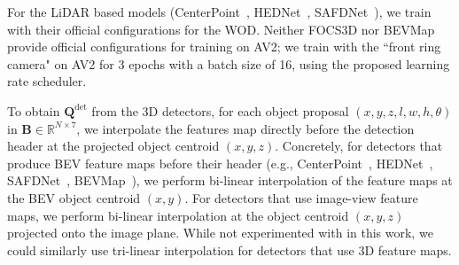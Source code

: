 For the LiDAR based models (CenterPoint~\cite{centerpoint}, HEDNet~\cite{hednet}, SAFDNet~\cite{safdnet}),
we train with their official configurations for the WOD.
Neither FOCS3D nor BEVMap provide official configurations for training on AV2;
we train with the ``front ring camera" on AV2 for 3 epochs with a batch size of 16, using the proposed learning rate scheduler.

To obtain $\mathbf{Q}^\mathrm{det}$ from the 3D detectors,
for each object proposal $(x, y, z, l, w, h, \theta)$ in $\mathbf{B} \in \mathbb{R}^{N \times 7}$,
we interpolate the features map directly before the detection header at the projected object centroid $(x, y, z)$.
Concretely, for detectors that produce BEV feature maps before their header
(e.g., CenterPoint~\cite{centerpoint}, HEDNet~\cite{hednet}, SAFDNet~\cite{safdnet}, BEVMap~\cite{chang2024bevmap}),
we perform bi-linear interpolation of the feature maps at the BEV object centroid $(x, y)$.
For detectors that use image-view feature maps, we perform bi-linear
interpolation at the object centroid $(x, y, z)$ projected onto the image plane.
While not experimented with in this work, we could similarly use tri-linear interpolation for detectors that use 3D feature maps.